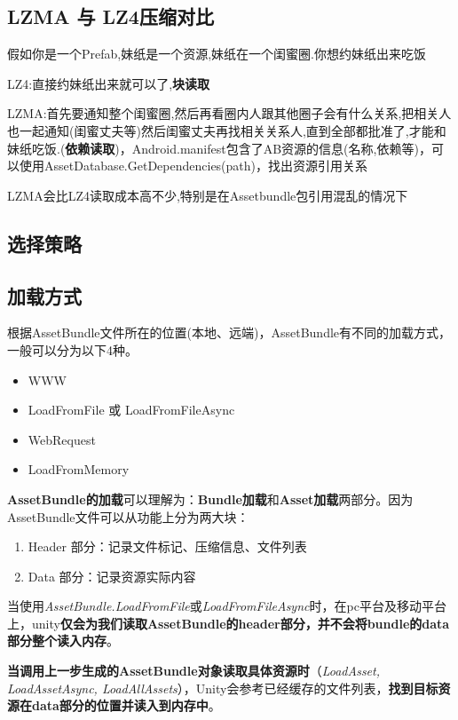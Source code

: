 \documentclass[UTF8,a4paper,12pt]{ctexbook}
\begin{document}
			\subsection{LZMA 与 LZ4压缩对比}
				假如你是一个Prefab,妹纸是一个资源,妹纸在一个闺蜜圈.你想约妹纸出来吃饭
			
				LZ4:直接约妹纸出来就可以了,\textbf{块读取}
			
				LZMA:首先要通知整个闺蜜圈,然后再看圈内人跟其他圈子会有什么关系,把相关人也一起通知(闺蜜丈夫等)然后闺蜜丈夫再找相关关系人,直到全部都批准了,才能和妹纸吃饭.(\textbf{依赖读取})，Android.manifest包含了AB资源的信息(名称,依赖等)，可以使用AssetDatabase.GetDependencies(path)，找出资源引用关系
				

				LZMA会比LZ4读取成本高不少,特别是在Assetbundle包引用混乱的情况下
				
				
			\subsection{选择策略}
				
				
		\subsection{加载方式}   
			根据AssetBundle文件所在的位置(本地、远端)，AssetBundle有不同的加载方式，一般可以分为以下4种。
			\begin{itemize}
				\item WWW
				\item LoadFromFile 或 LoadFromFileAsync
				\item WebRequest
				\item LoadFromMemory
			\end{itemize} 
			
			\textbf{AssetBundle的加载}可以理解为：\textbf{Bundle加载}和\textbf{Asset加载}两部分。因为AssetBundle文件可以从功能上分为两大块：
			\begin{enumerate}
				\item Header 部分：记录文件标记、压缩信息、文件列表
				\item Data 部分：记录资源实际内容
			\end{enumerate}
			
			当使用\textit{AssetBundle.LoadFromFile}或\textit{LoadFromFileAsync}时，在pc平台及移动平台上，unity\textbf{仅会为我们读取AssetBundle的header部分，并不会将bundle的data部分整个读入内存}。
			
			\textbf{当调用上一步生成的AssetBundle对象读取具体资源时}（\textit{LoadAsset, LoadAssetAsync, LoadAllAssets}），Unity会参考已经缓存的文件列表，\textbf{找到目标资源在data部分的位置并读入到内存中}。
\end{document}
